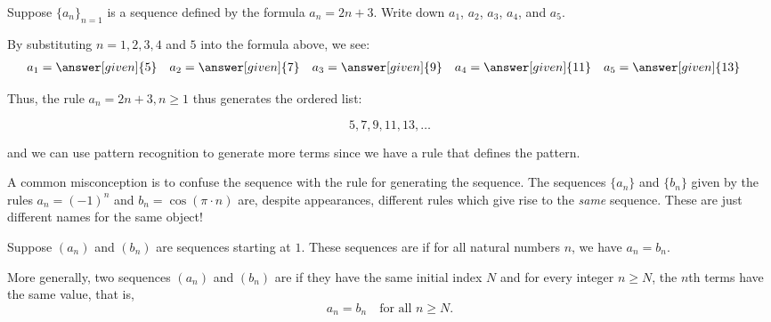 \documentclass{ximera}
\begin{document}
\begin{example}
Suppose $\{a_n\}_{n=1}$ is a sequence defined by the formula $a_n = 2n+3$.  Write down $a_1$, $a_2$, $a_3$, $a_4$, and $a_5$.

  \begin{explanation}
    By substituting $n=1, 2, 3, 4$ and $5$ into the formula above, we see:
    \begin{align*}
      a_1 &= \answer[given]{5} & 
      a_2 &= \answer[given]{7} & 
      a_3 &= \answer[given]{9} & 
      a_4 &= \answer[given]{11} & 
      a_5 &= \answer[given]{13} 
    \end{align*}
    
Thus, the rule $a_n = 2n+3, n \geq 1$ thus generates the ordered list:

\[
5,7,9,11,13, \dots
\]   

and we can use pattern recognition to generate more terms since we have a rule that defines the pattern.
  \end{explanation}
  
\end{example}

%

\begin{warning}
  A common misconception is to confuse the sequence with the rule for
  generating the sequence.  The sequences $\{a_n\}$ and $\{b_n\}$ given by
  the rules $a_n = (-1)^n$ and $b_n = \cos (\pi \cdot n)$ are, despite
  appearances, different rules which give rise to the \textit{same}
  sequence.  These are just different names for the same object!
\end{warning}


\begin{definition}
  Suppose $(a_n)$ and $(b_n)$ are sequences starting at $1$.  These
  sequences are  if for all
  natural numbers $n$, we have $a_n = b_n$.

  More generally, two sequences $(a_n)$ and $(b_n)$ are
   if they have the same initial index $N$  and for
  every integer $n \geq N$, the $n$th terms have the same value, that is,
  \[
  a_n = b_n \quad \text{for all $n \geq N$.}
  \]
\end{definition}
\end{document}
